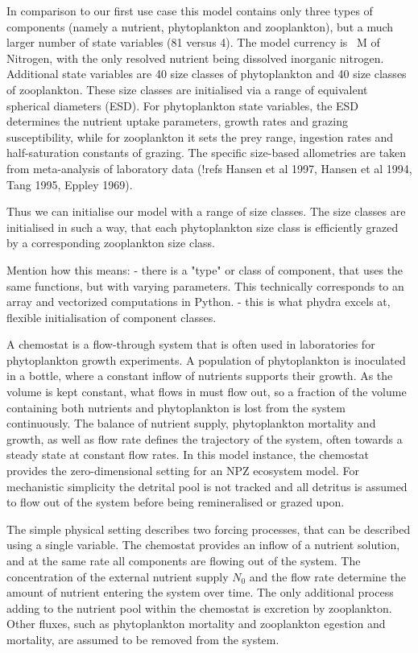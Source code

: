\documentclass[template.tex]{subfiles}
\begin{document}
In comparison to our first use case this model contains only three types of components (namely a nutrient, phytoplankton and zooplankton), but a much larger number of state variables (81 versus 4). The model currency is \unit{\mu M} of Nitrogen, with the only resolved nutrient being dissolved inorganic nitrogen. Additional state variables are 40 size classes of phytoplankton and 40 size classes of zooplankton. These size classes are initialised via a range of equivalent spherical diameters (ESD). For phytoplankton state variables, the ESD determines the nutrient uptake parameters, growth rates and grazing susceptibility, while for zooplankton it sets the prey range, ingestion rates and half-saturation constants of grazing. The specific size-based allometries are taken from meta-analysis of laboratory data (!refs Hansen et al 1997, Hansen et al 1994, Tang 1995, Eppley 1969). 

Thus we can initialise our model with a range of size classes. The size classes are initialised in such a way, that each phytoplankton size class is efficiently grazed by a corresponding zooplankton size class.

Mention how this means:
- there is a "type" or class of component, that uses the same functions, but with varying parameters. This technically corresponds to an array and vectorized computations in Python.
- this is what phydra excels at, flexible initialisation of component classes.

A chemostat is a flow-through system that is often used in laboratories for phytoplankton growth experiments. A population of phytoplankton is inoculated in a bottle, where a constant inflow of nutrients supports their growth. As the volume is kept constant, what flows in must flow out, so a fraction of the volume containing both nutrients and phytoplankton is lost from the system continuously. The balance of nutrient supply, phytoplankton mortality and growth, as well as flow rate defines the trajectory of the system, often towards a steady state at constant flow rates. 
In this model instance, the chemostat provides the zero-dimensional setting for an NPZ ecosystem model. For mechanistic simplicity the detrital pool is not tracked and all detritus is assumed to flow out of the system before being remineralised or grazed upon.

The simple physical setting describes two forcing processes, that can be described using a single variable. The chemostat provides an inflow of a nutrient solution, and at the same rate all components are flowing out of the system. The concentration of the external nutrient supply $N_0$ and the flow rate determine the amount of nutrient entering the system over time. The only additional process adding to the nutrient pool within the chemostat is excretion by zooplankton. Other fluxes, such as phytoplankton mortality and zooplankton egestion and mortality, are assumed to be removed from the system.
\end{document}
